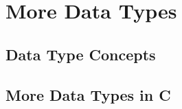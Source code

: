 \chapter{More Data Types} %
\label{cha:more_data_types}

\minitoc

\section{Data Type Concepts} %
\label{sec:data_type_concepts}



% 






\clearpage
\section{More Data Types in C} %
\label{sec:more_data_types_in_c}



% 






